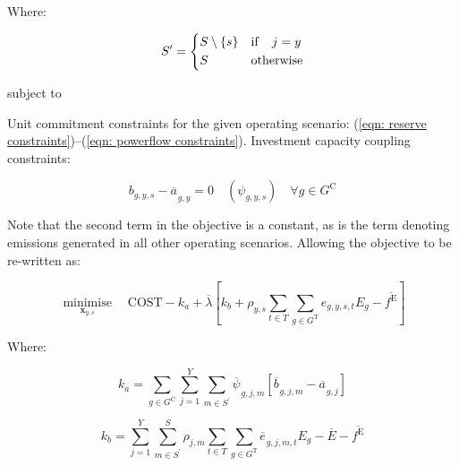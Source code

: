 \documentclass{article}
\newcommand{\sGeneratorsCandidate}{G^{\mathrm{C}}}
\newcommand{\sGeneratorsThermal}{G^{\mathrm{T}}}
\newcommand{\sYears}{Y}
\newcommand{\sScenarios}{S}
\newcommand{\sIntervals}{T}
\newcommand{\iGenerator}{g}
\newcommand{\iYear}{y}
\newcommand{\iYearAlias}{j}
\newcommand{\iScenario}{s}
\newcommand{\iScenarioAlias}{m}
\newcommand{\iInterval}{t}
\newcommand{\cScenarioDuration}[1][\iYear,\iScenario]{\rho_{#1}}
\newcommand{\cEmissionsIntensity}[1][\iGenerator]{E_{#1}}
\newcommand{\cEmmissionsCumulativeTarget}{\overline{E}}
\newcommand{\cObjectiveFunction}{\mathrm{COST}}
\newcommand{\vEnergy}[1][\iGenerator,\iYear,\iScenario,\iInterval]{e_{#1}}
\newcommand{\vEmissionsTargetViolation}{f^{\mathrm{E}}}
\newcommand{\vInstalledCapacityTotal}[1][\iGenerator,\iYear]{a_{#1}}
\newcommand{\vInstalledCapacityTotalScenario}[1][\iGenerator,\iYear,\iScenario]{b_{#1}}
\newcommand{\vFixedCapacityDual}[1][\iGenerator,\iYear,\iScenario]{\psi_{#1}}
\DeclareMathOperator*{\minimise}{minimise}
\begin{document}
Where:

\begin{equation}
	\sScenarios^{\prime} = 
	\begin{dcases}
	\sScenarios \setminus \{\iScenario\} & \mathrm{if} \quad \iYearAlias = \iYear\\
	\sScenarios & \mathrm{otherwise}\\
	\end{dcases}
\end{equation}

subject to

Unit commitment constraints for the given operating scenario: (\ref{eqn: reserve constraints})--(\ref{eqn: powerflow constraints}). Investment capacity coupling constraints:

\begin{equation}
\vInstalledCapacityTotalScenario - \overline{\vInstalledCapacityTotal[]}_{\iGenerator,\iYear} = 0 \quad (\vFixedCapacityDual) \quad \forall \iGenerator \in \sGeneratorsCandidate
\label{eqn: fixed candidate capacity constraint}
\end{equation}

Note that the second term in the objective is a constant, as is the term denoting emissions generated in all other operating scenarios. Allowing the objective to be re-written as:

\begin{equation}
	\minimise\limits_{\bm{x}_{\iYear,\iScenario}} \quad\cObjectiveFunction - k_{a} + \overline{\lambda} \left[k_{b} + \cScenarioDuration\sum\limits_{\iInterval \in \sIntervals}\sum\limits_{\iGenerator \in \sGeneratorsThermal} \vEnergy[\iGenerator,\iYear,\iScenario,\iInterval] \cEmissionsIntensity - \overline{\vEmissionsTargetViolation}\right]
\end{equation}

Where:

\begin{equation}
	k_{a} = \sum\limits_{\iGenerator \in \sGeneratorsCandidate}\sum\limits_{\iYearAlias=1}^{\sYears}\sum\limits_{\iScenarioAlias \in\sScenarios^{\prime}}\overline{\vFixedCapacityDual[]}_{\iGenerator,\iYearAlias,\iScenarioAlias}\left[\overline{\vInstalledCapacityTotalScenario[]}_{\iGenerator,\iYearAlias,\iScenarioAlias} - \overline{\vInstalledCapacityTotal[]}_{\iGenerator,\iYearAlias}\right]
\end{equation}

\begin{equation}
	k_{b} = \sum\limits_{\iYearAlias=1}^{\sYears} \sum\limits_{\iScenarioAlias \in \sScenarios^{\prime}}^{\sScenarios} \cScenarioDuration[\iYearAlias,\iScenarioAlias] \sum\limits_{\iInterval \in \sIntervals} \sum\limits_{\iGenerator \in \sGeneratorsThermal} \overline{\vEnergy[]}_{\iGenerator,\iYearAlias,\iScenarioAlias,\iInterval} \cEmissionsIntensity - \cEmmissionsCumulativeTarget - \overline{\vEmissionsTargetViolation}
\end{equation}
\end{document}
